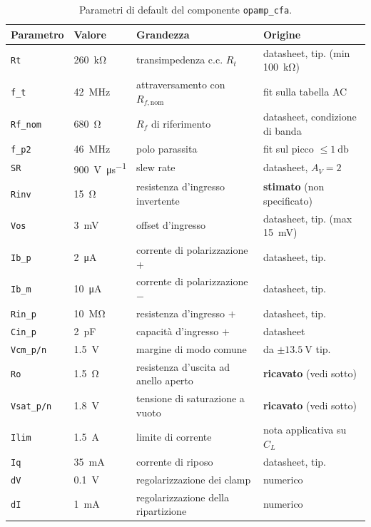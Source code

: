 \documentclass[11pt,a4paper]{article}
\newcommand{\opamp}{\texttt{opamp\_cfa}}
\begin{document}
\begin{table}[h]
\centering
\small
\begin{tabular}{llll}
\toprule
Parametro & Valore & Grandezza & Origine \\
\midrule
\texttt{Rt}      & \SI{260}{\kilo\ohm}  & transimpedenza c.c. $R_t$ & datasheet, tip. (min \SI{100}{\kilo\ohm}) \\
\texttt{f\_t}    & \SI{42}{\mega\hertz} & attraversamento con $R_{f,\mathrm{nom}}$ & fit sulla tabella AC \\
\texttt{Rf\_nom} & \SI{680}{\ohm}       & $R_f$ di riferimento & datasheet, condizione di banda \\
\texttt{f\_p2}   & \SI{46}{\mega\hertz} & polo parassita & fit sul picco $\le\SI{1}{\decibel}$ \\
\texttt{SR}      & \SI{900}{\volt\per\micro\second} & slew rate & datasheet, $A_V=2$ \\
\midrule
\texttt{Rinv}    & \SI{15}{\ohm}        & resistenza d'ingresso invertente & \textbf{stimato} (non specificato) \\
\texttt{Vos}     & \SI{3}{\milli\volt}  & offset d'ingresso & datasheet, tip. (max \SI{15}{\milli\volt}) \\
\texttt{Ib\_p}   & \SI{2}{\micro\ampere}  & corrente di polarizzazione $+$ & datasheet, tip. \\
\texttt{Ib\_m}   & \SI{10}{\micro\ampere} & corrente di polarizzazione $-$ & datasheet, tip. \\
\texttt{Rin\_p}  & \SI{10}{\mega\ohm}   & resistenza d'ingresso $+$ & datasheet, tip. \\
\texttt{Cin\_p}  & \SI{2}{\pico\farad}  & capacità d'ingresso $+$ & datasheet \\
\texttt{Vcm\_p/n}& \SI{1.5}{\volt}      & margine di modo comune & da $\pm\SI{13.5}{\volt}$ tip. \\
\midrule
\texttt{Ro}      & \SI{1.5}{\ohm}       & resistenza d'uscita ad anello aperto & \textbf{ricavato} (vedi sotto) \\
\texttt{Vsat\_p/n}& \SI{1.8}{\volt}     & tensione di saturazione a vuoto & \textbf{ricavato} (vedi sotto) \\
\texttt{Ilim}    & \SI{1.5}{\ampere}    & limite di corrente & nota applicativa su $C_L$ \\
\texttt{Iq}      & \SI{35}{\milli\ampere} & corrente di riposo & datasheet, tip. \\
\midrule
\texttt{dV}      & \SI{0.1}{\volt}      & regolarizzazione dei clamp & numerico \\
\texttt{dI}      & \SI{1}{\milli\ampere}& regolarizzazione della ripartizione & numerico \\
\bottomrule
\end{tabular}
\caption{Parametri di default del componente \opamp{}.}
\label{tab:par}
\end{table}
\end{document}

